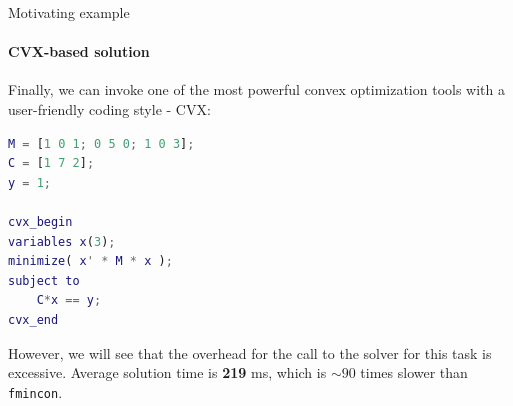 \documentclass{beamer}
\begin{document}
\begin{frame}[fragile]{Motivating example}
\framesubtitle{CVX-based solution}
\begin{flushleft}

Finally, we can invoke one of the most powerful convex optimization tools with a user-friendly coding style - CVX:

\begin{lstlisting}[language=Matlab]
M = [1 0 1; 0 5 0; 1 0 3];
C = [1 7 2];
y = 1;

cvx_begin
variables x(3);
minimize( x' * M * x );
subject to
    C*x == y;
cvx_end
\end{lstlisting}

However, we will see that the overhead for the call to the solver for this task is excessive. Average solution time is \textbf{219} ms, which is $\sim 90$ times slower than \texttt{fmincon}.

\end{flushleft}
\end{frame}




%
%

\myqrframe
\end{document}
